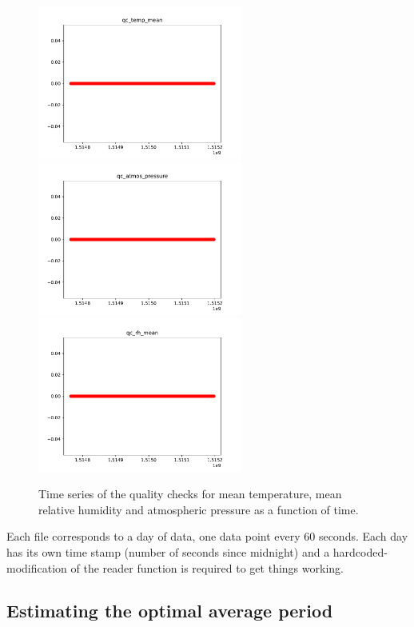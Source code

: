 \documentclass[11pt]{amsart}
\begin{document}
\begin{figure}
    \includegraphics[width=0.6\textwidth]{../plots/qc_temp_mean.pdf}
    \includegraphics[width=0.6\textwidth]{../plots/qc_atmos_pressure.pdf}
    \includegraphics[width=0.6\textwidth]{../plots/qc_rh_mean.pdf}
    \caption{Time series of the quality checks for mean temperature, mean relative humidity and atmospheric pressure as a function of time.}
\end{figure}

Each file corresponds to a day of data, one data point every 60 seconds.
Each day has its own time stamp (number of seconds since midnight) and a hardcoded-modification of the reader function is required to get things working.

\subsection{Estimating the optimal average period}
\end{document}
